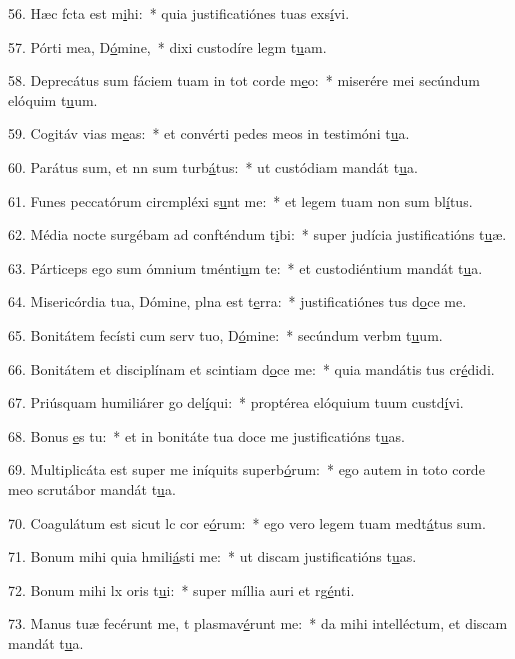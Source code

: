 56. Hæc fcta est m\uline{i}hi:~* quia justificatiónes tuas exs\uline{í}vi.\par 
57. Pórti mea, D\uline{ó}mine,~* dixi custodíre legm t\uline{u}am.\par 
58. Deprecátus sum fáciem tuam in tot corde m\uline{e}o:~* miserére mei secúndum elóquim t\uline{u}um.\par 
59. Cogitáv vias m\uline{e}as:~* et convérti pedes meos in testimóni t\uline{u}a.\par 
60. Parátus sum, et nn sum turb\uline{á}tus:~* ut custódiam mandát t\uline{u}a.\par 
61. Funes peccatórum circmpléxi s\uline{u}nt me:~* et legem tuam non sum bl\uline{í}tus.\par 
62. Média nocte surgébam ad confténdum t\uline{i}bi:~* super judícia justificatións t\uline{u}æ.\par 
63. Párticeps ego sum ómnium tménti\uline{u}m te:~* et custodiéntium mandát t\uline{u}a.\par 
64. Misericórdia tua, Dómine, plna est t\uline{e}rra:~* justificatiónes tus d\uline{o}ce me.\par 
65. Bonitátem fecísti cum serv tuo, D\uline{ó}mine:~* secúndum verbm t\uline{u}um.\par 
66. Bonitátem et disciplínam et scintiam d\uline{o}ce me:~* quia mandátis tus cr\uline{é}didi.\par 
67. Priúsquam humiliárer go del\uline{í}qui:~* proptérea elóquium tuum custd\uline{í}vi.\par 
68. Bonus \uline{e}s tu:~* et in bonitáte tua doce me justificatións t\uline{u}as.\par 
69. Multiplicáta est super me iníquits superb\uline{ó}rum:~* ego autem in toto corde meo scrutábor mandát t\uline{u}a.\par 
70. Coagulátum est sicut lc cor e\uline{ó}rum:~* ego vero legem tuam medt\uline{á}tus sum.\par 
71. Bonum mihi quia hmili\uline{á}sti me:~* ut discam justificatións t\uline{u}as.\par 
72. Bonum mihi lx oris t\uline{u}i:~* super míllia auri et rg\uline{é}nti.\par 
73. Manus tuæ fecérunt me, t plasmav\uline{é}runt me:~* da mihi intelléctum, et discam mandát t\uline{u}a.\par 
